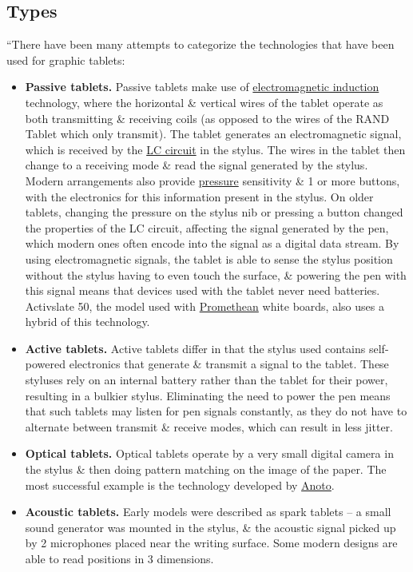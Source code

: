 \documentclass[oneside]{book}
\numberwithin{equation}{section}
\begin{document}
\subsection{Types}
``There have been many attempts to categorize the technologies that have been used for graphic tablets:
\begin{itemize}
	\item \textbf{Passive tablets.} Passive tablets make use of \href{https://en.wikipedia.org/wiki/Electromagnetic_induction}{electromagnetic induction} technology, where the horizontal \& vertical wires of the tablet operate as both transmitting \& receiving coils (as opposed to the wires of the RAND Tablet which only transmit). The tablet generates an electromagnetic signal, which is received by the \href{https://en.wikipedia.org/wiki/LC_circuit}{LC circuit} in the stylus. The wires in the tablet then change to a receiving mode \& read the signal generated by the stylus. Modern arrangements also provide \href{https://en.wikipedia.org/wiki/Pressure}{pressure} sensitivity \& 1 or more buttons, with the electronics for this information present in the stylus. On older tablets, changing the pressure on the stylus nib or pressing a button changed the properties of the LC circuit, affecting the signal generated by the pen, which modern ones often encode into the signal as a digital data stream. By using electromagnetic signals, the tablet is able to sense the stylus position without the stylus having to even touch the surface, \& powering the pen with this signal means that devices used with the tablet never need batteries. Activslate 50, the model used with \href{https://en.wikipedia.org/wiki/Promethean_Ltd}{Promethean} white boards, also uses a hybrid of this technology.
	\item \textbf{Active tablets.} Active tablets differ in that the stylus used contains self-powered electronics that generate \& transmit a signal to the tablet. These styluses rely on an internal battery rather than the tablet for their power, resulting in a bulkier stylus. Eliminating the need to power the pen means that such tablets may listen for pen signals constantly, as they do not have to alternate between transmit \& receive modes, which can result in less jitter.
	\item \textbf{Optical tablets.} Optical tablets operate by a very small digital camera in the stylus \& then doing pattern matching on the image of the paper. The most successful example is the technology developed by \href{https://en.wikipedia.org/wiki/Anoto}{Anoto}.
	\item \textbf{Acoustic tablets.} Early models were described as spark tablets -- a small sound generator was mounted in the stylus, \& the acoustic signal picked up by 2 microphones placed near the writing surface. Some modern designs are able to read positions in 3 dimensions.

\end{itemize}
\end{document}
